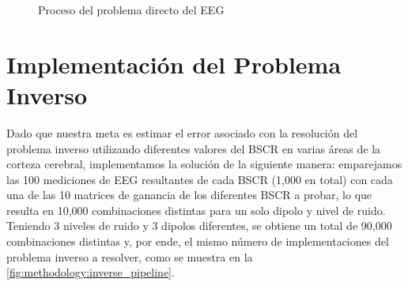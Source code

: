 \begin{figure}[!b]
    \centering
    \caption{Proceso del problema directo del EEG}
    \label{fig:methodology:direct_pipeline}
\end{figure}


\section{Implementación del Problema Inverso}
\label{sec:methodology:inverse_solved}

Dado que nuestra meta es estimar el error asociado con la resolución del problema inverso utilizando diferentes valores del BSCR en varias áreas de la corteza cerebral, implementamos la solución de la siguiente manera: emparejamos las 100 mediciones de EEG resultantes de cada BSCR (1,000 en total) con cada una de las 10 matrices de ganancia de los diferentes BSCR a probar, lo que resulta en 10,000 combinaciones distintas para un solo dipolo y nivel de ruido.
Teniendo 3 niveles de ruido y 3 dipolos diferentes, se obtiene un total de 90,000 combinaciones distintas y, por ende, el mismo número de implementaciones del problema inverso a resolver, como se muestra en la \cref{fig:methodology:inverse_pipeline}.

